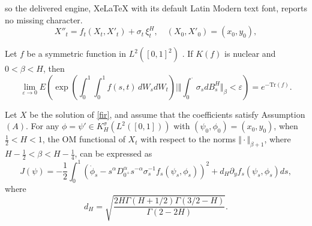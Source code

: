 \documentclass[10pt,a4paper]{amsart}
\begin{document}
so the delivered engine, XeLaTeX with its default Latin Modern text font, reports no missing character.
\begin{equation}
    X''_t = f_t(X_t, X'_t) + \sigma_t \, \xi^H_t, \quad (X_0, X'_0) = (x_0, y_0), \label{fir}
\end{equation}

	\begin{lemma}\label{estimate2}
Let \( f \) be a symmetric function in \( L^{2}([0,1]^{2}) \) . If \( K(f) \) is nuclear  and $0<\beta<H$, then 
\[
\lim _{\varepsilon \to 0} E\left( \exp \left( \int_{0}^{1} \int_{0}^{1} f(s, t) \, d W_{s} d W_{t} \right) \mid \Vert\int_0^\cdot \sigma_s dB^H_s \Vert_\beta < \varepsilon \right) = e^{-\text{Tr}(f)}.
\]
\end{lemma}

\begin{theorem} \label{result2}  Let $X$ be the solution of \eqref{fir}, and assume that the coefficients satisfy Assumption \((A)\).
For any $\phi=\psi' \in K_H^\sigma(L^2([0,1]))$ with $(\psi_0,\phi_0) =(x_0,y_0)$, when $ \tfrac{1}{2} < H < 1$, 
the OM functional of $X_t$ with respect to the norms 
$\Vert \cdot \Vert_{\beta+1}$, where $H-\tfrac{1}{2}<\beta<H-\tfrac{1}{4}$, 
 can be expressed as 
	\begin{equation*}
	J(\psi)=-\frac{1}{2} \int_0^1 \left(\dot{\phi}_s-s^{\alpha}D_{0^+}^\alpha s^{-\alpha}  \sigma_s^{-1} f_s\left(\psi_s,\phi_s\right)\right)^2+d_H \partial_yf_s(\psi_s,\phi_s)ds,
\end{equation*}
where
\begin{equation*}
    d_H= \sqrt{\frac{2H\Gamma(H+1/2)\Gamma(3/2-H)}{\Gamma(2-2H)}}.
\end{equation*}

\end{theorem}
\end{document}
